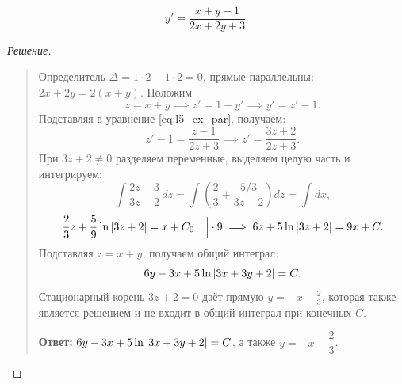 \begin{example} ~
    \begin{equation} \label{eq:l5_ex_par}
        y' = \frac{x + y - 1}{2x + 2y + 3}. \tag{15}
    \end{equation}

    \begin{proof}[Решение]~\\
        \begin{quote}
            Определитель $\Delta = 1 \cdot 2 - 1 \cdot 2 = 0$, прямые
            параллельны: $2x + 2y = 2(x + y)$. Положим
            \[
                z = x + y \implies z' = 1 + y' \implies y' = z' - 1.
            \]
            Подставляя в уравнение \eqref{eq:l5_ex_par}, получаем:
            \[
                z' - 1 = \frac{z - 1}{2z + 3} \implies
                z' = \frac{3z + 2}{2z + 3}.
            \]
            При $3z + 2 \neq 0$ разделяем переменные, выделяем целую часть и
            интегрируем:
            \[
                \int \frac{2z + 3}{3z + 2} \, dz =
                \int \left(\frac{2}{3} + \frac{5/3}{3z + 2}\right) dz =
                \int dx,
            \]
            \[
                \frac{2}{3} z + \frac{5}{9} \ln \left| 3z + 2 \right| = x + C_0
                \quad \Big| \cdot 9 \implies
                6z + 5 \ln \left| 3z + 2 \right| = 9x + C.
            \]
            Подставляя $z = x + y$, получаем общий интеграл:
            \[
                6y - 3x + 5 \ln \left| 3x + 3y + 2 \right| = C.
            \]
            Стационарный корень $3z + 2 = 0$ даёт прямую
            $y = -x - \frac{2}{3}$, которая также является решением и не
            входит в общий интеграл при конечных $C$.

            \textbf{Ответ:} $6y - 3x + 5 \ln \left| 3x + 3y + 2 \right| = C$, а также
            $y = -x - \dfrac{2}{3}$.
        \end{quote}
    \end{proof}
\end{example}